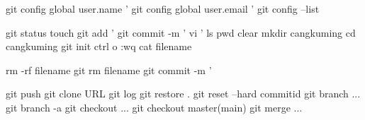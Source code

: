 git config global user.name '%
git config global user.email '%
git config --list %

git status
touch %
git add '%
git commit -m '%
vi '%
ls %
pwd %
clear
mkdir cangkuming  %
cd cangkuming %
git init %
ctrl o %
:wq   %
cat filename %

rm -rf filename
git rm filename
git commit -m '%

git push %
git clone URL
git log %
git restore . %
git reset --hard commitid %
git branch ... %
git branch -a %
git checkout ...%
git checkout master(main) %
git merge ... %

